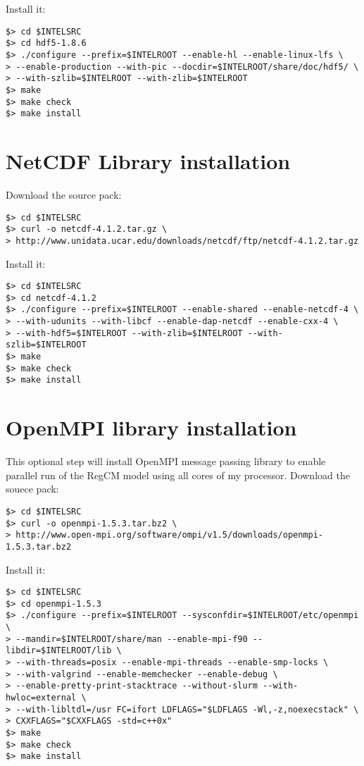 Install it:

\begin{Verbatim}
$> cd $INTELSRC
$> cd hdf5-1.8.6
$> ./configure --prefix=$INTELROOT --enable-hl --enable-linux-lfs \
> --enable-production --with-pic --docdir=$INTELROOT/share/doc/hdf5/ \
> --with-szlib=$INTELROOT --with-zlib=$INTELROOT
$> make
$> make check
$> make install
\end{Verbatim}

\section{NetCDF Library installation}

Download the source pack:

\begin{Verbatim}
$> cd $INTELSRC
$> curl -o netcdf-4.1.2.tar.gz \
> http://www.unidata.ucar.edu/downloads/netcdf/ftp/netcdf-4.1.2.tar.gz
\end{Verbatim}

Install it:

\begin{Verbatim}
$> cd $INTELSRC
$> cd netcdf-4.1.2
$> ./configure --prefix=$INTELROOT --enable-shared --enable-netcdf-4 \
> --with-udunits --with-libcf --enable-dap-netcdf --enable-cxx-4 \
> --with-hdf5=$INTELROOT --with-zlib=$INTELROOT --with-szlib=$INTELROOT
$> make
$> make check
$> make install
\end{Verbatim}

\section{OpenMPI library installation}

This optional step will install OpenMPI message passing library to enable
parallel run of the RegCM model using all cores of my processor.
Download the souece pack:

\begin{Verbatim}
$> cd $INTELSRC
$> curl -o openmpi-1.5.3.tar.bz2 \
> http://www.open-mpi.org/software/ompi/v1.5/downloads/openmpi-1.5.3.tar.bz2
\end{Verbatim}

Install it:

\begin{Verbatim}
$> cd $INTELSRC
$> cd openmpi-1.5.3
$> ./configure --prefix=$INTELROOT --sysconfdir=$INTELROOT/etc/openmpi \
> --mandir=$INTELROOT/share/man --enable-mpi-f90 --libdir=$INTELROOT/lib \
> --with-threads=posix --enable-mpi-threads --enable-smp-locks \
> --with-valgrind --enable-memchecker --enable-debug \
> --enable-pretty-print-stacktrace --without-slurm --with-hwloc=external \
> --with-libltdl=/usr FC=ifort LDFLAGS="$LDFLAGS -Wl,-z,noexecstack" \
> CXXFLAGS="$CXXFLAGS -std=c++0x"
$> make
$> make check
$> make install
\end{Verbatim}

